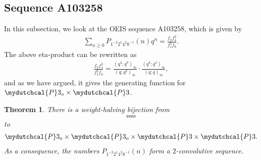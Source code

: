 \documentclass[12pt,reqno]{amsart}
\numberwithin{equation}{section}
\theoremstyle{plain}
\newtheorem{theorem}{Theorem}[section]
\theoremstyle{definition}
\theoremstyle{named}
\newcommand{\cP}{\mydutchcal{P}}
\newcommand{\even}{\mathsf{even}}
\begin{document}
\subsection{Sequence A103258}

In this subsection, we look at the OEIS sequence A103258, which is given by
\begin{align*}
	\sum_{n\ge 0} P_{1^{-2} 2^1 4^{2} 8^{-1}}(n) q^n = \frac{f_2 f_4^2}{f_1^2 f_8}.
\end{align*}
The above eta-product can be rewritten as
\begin{align*}
	\frac{f_2 f_4^2}{f_1^2 f_8} = \frac{(q^4;q^8)_\infty}{(q;q^2)_\infty}\cdot \frac{(q^4;q^4)_\infty}{(q;q)_\infty},
\end{align*}
and as we have argued, it gives the generating function for $\cP3_{o} \times \cP3$.

\begin{theorem}\label{thm:A103258}
	There is a weight-halving bijection from
	\begin{align*}
		[\cP3_{o} \times \cP3]_\even
	\end{align*}
	to
	\begin{align*}
		\cP3_{o} \times \cP3_{o} \times \cP3 \times \cP3.
	\end{align*}
	As a consequence, the numbers $P_{1^{-2} 2^1 4^{2} 8^{-1}}(n)$ form a $2$-convolutive sequence.
\end{theorem}
\end{document}
